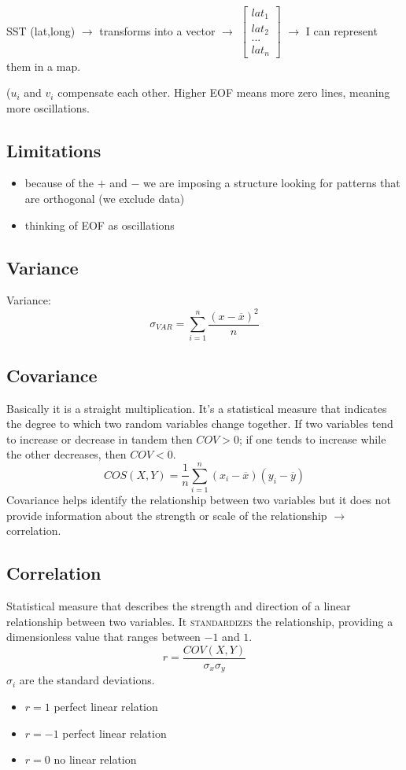     SST (lat,long) $\rightarrow$ transforms into a vector $\rightarrow$ $\begin{bmatrix}
        lat_1\\
        lat_2\\
        ...\\
        lat_n
    \end{bmatrix}$ $\rightarrow$ I can represent them in a map.

($u_i$ and $v_i$ compensate each other. Higher EOF means more zero lines, meaning more oscillations. 
\subsection{Limitations}
\begin{itemize}
    \item because of the $+$ and $-$ we are imposing a structure looking for patterns that are orthogonal (we exclude data)
    \item thinking of EOF as oscillations
\end{itemize}
\subsection{Variance}
Variance: 
\begin{equation}
    \sigma_{VAR}=\displaystyle\sum_{i=1}^n\frac{(x-\overline{x})^2}{n}
\end{equation}
\subsection{Covariance}
Basically it is a straight multiplication. It's a statistical measure that indicates the degree to which two random variables change together. If two variables tend to increase or decrease in tandem then $COV>0$; if one tends to increase while the other decreases, then $COV<0$. 
\begin{equation}
    COS(X,Y)=\frac{1}{n}\sum_{i=1}^n(x_i-\overline{x})(y_i-\overline{y})
\end{equation}
Covariance helps identify the relationship between two variables but it does not provide information about the strength or scale of the relationship $\rightarrow$ correlation.
\subsection{Correlation}
Statistical measure that describes the strength and direction of a linear relationship between two variables. It \textsc{standardizes} the relationship, providing a dimensionless value that ranges between $-1$ and $1$. 
\begin{equation}
    r=\frac{COV(X,Y)}{\sigma_x\sigma_y}
\end{equation}
$\sigma_i$ are the standard deviations. 
\begin{itemize}
    \item $r=1$ perfect  linear relation
    \item $r=-1$  perfect  linear relation
    \item $r=0$ no linear relation
\end{itemize}

